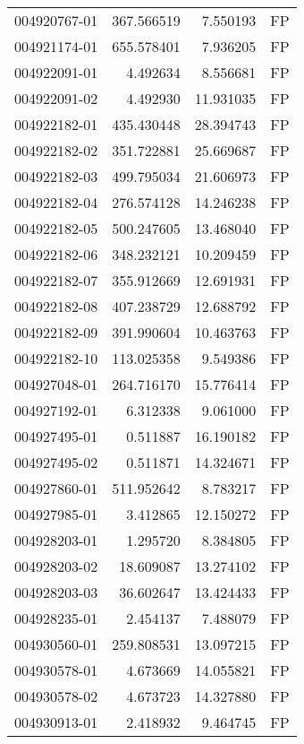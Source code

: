 \begin{tabular}{lrrl}
004920767-01 &  367.566519 &       7.550193 &   FP \\
004921174-01 &  655.578401 &       7.936205 &   FP \\
004922091-01 &    4.492634 &       8.556681 &   FP \\
004922091-02 &    4.492930 &      11.931035 &   FP \\
004922182-01 &  435.430448 &      28.394743 &   FP \\
004922182-02 &  351.722881 &      25.669687 &   FP \\
004922182-03 &  499.795034 &      21.606973 &   FP \\
004922182-04 &  276.574128 &      14.246238 &   FP \\
004922182-05 &  500.247605 &      13.468040 &   FP \\
004922182-06 &  348.232121 &      10.209459 &   FP \\
004922182-07 &  355.912669 &      12.691931 &   FP \\
004922182-08 &  407.238729 &      12.688792 &   FP \\
004922182-09 &  391.990604 &      10.463763 &   FP \\
004922182-10 &  113.025358 &       9.549386 &   FP \\
004927048-01 &  264.716170 &      15.776414 &   FP \\
004927192-01 &    6.312338 &       9.061000 &   FP \\
004927495-01 &    0.511887 &      16.190182 &   FP \\
004927495-02 &    0.511871 &      14.324671 &   FP \\
004927860-01 &  511.952642 &       8.783217 &   FP \\
004927985-01 &    3.412865 &      12.150272 &   FP \\
004928203-01 &    1.295720 &       8.384805 &   FP \\
004928203-02 &   18.609087 &      13.274102 &   FP \\
004928203-03 &   36.602647 &      13.424433 &   FP \\
004928235-01 &    2.454137 &       7.488079 &   FP \\
004930560-01 &  259.808531 &      13.097215 &   FP \\
004930578-01 &    4.673669 &      14.055821 &   FP \\
004930578-02 &    4.673723 &      14.327880 &   FP \\
004930913-01 &    2.418932 &       9.464745 &   FP \\

\end{tabular}
